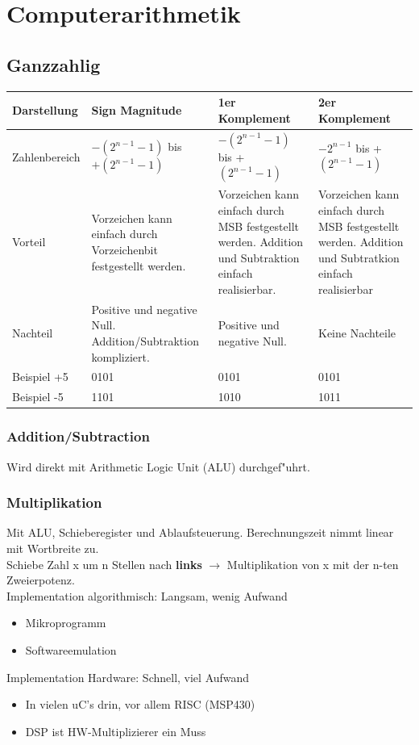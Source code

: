 \section{Computerarithmetik}

\subsection{Ganzzahlig}
\begin{tabular}{|p{3cm}|p{4.5cm}|p{4.5cm}|p{4.5cm}|}
\hline
Darstellung & Sign Magnitude & 1er Komplement & 2er Komplement\\
\hline
Zahlenbereich & $-(2^{n-1}-1)$ bis $+(2^{n-1}-1)$ & $-(2^{n-1}-1)$ bis +$(2^{n-1}-1)$ & $-2^{n-1}$ bis +$(2^{n-1}-1)$\\
\hline
Vorteil & Vorzeichen kann einfach durch Vorzeichenbit festgestellt werden. & Vorzeichen kann einfach durch MSB festgestellt werden. Addition und Subtraktion einfach realisierbar. & Vorzeichen kann einfach durch MSB festgestellt werden. Addition und Subtratkion einfach realisierbar \\ 
\hline
Nachteil & Positive und negative Null. Addition/Subtraktion kompliziert. & Positive und negative Null. & Keine Nachteile\\
\hline
Beispiel +5 & 0101 & 0101 & 0101 \\
Beispiel -5 & 1101 & 1010 & 1011 \\
\hline
\end{tabular}
\subsubsection{Addition/Subtraction}
Wird direkt mit Arithmetic Logic Unit (ALU) durchgef"uhrt.
\subsubsection{Multiplikation}
Mit ALU, Schieberegister und Ablaufsteuerung. Berechnungszeit nimmt linear mit Wortbreite zu.\\ Schiebe Zahl x um n Stellen nach \textbf{links} $\rightarrow$ Multiplikation von x mit der n-ten Zweierpotenz. \\
Implementation algorithmisch: Langsam, wenig Aufwand
\begin{itemize}
\item Mikroprogramm
\item Softwareemulation
\end{itemize}
Implementation Hardware: Schnell, viel Aufwand
\begin{itemize}
\item In vielen uC's drin, vor allem RISC (MSP430)
\item DSP ist HW-Multiplizierer ein Muss
\end{itemize}
